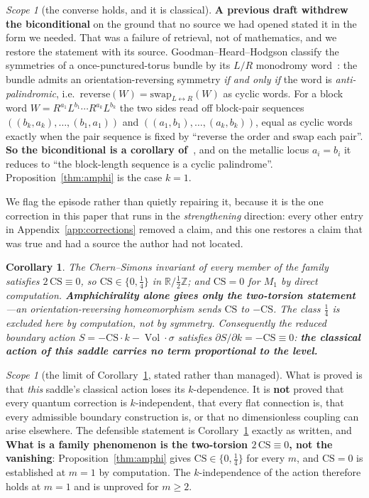 \documentclass[11pt,reqno]{amsart}
\theoremstyle{plain}
\newtheorem{corollary}[theorem]{Corollary}
\theoremstyle{definition}
\theoremstyle{remark}
\newtheorem{scope}[theorem]{Scope}
\newcommand{\Z}{\mathbb{Z}}
\newcommand{\R}{\mathbb{R}}
\newcommand{\Vol}{\operatorname{Vol}}
\begin{document}
\begin{scope}[the converse holds, and it is classical]\label{sc:amphiscope}
\textbf{A previous draft withdrew the biconditional} on the ground that no source we had
opened stated it in the form we needed. That was a failure of retrieval, not of
mathematics, and we restore the statement with its source. Goodman--Heard--Hodgson
classify the symmetries of a once-punctured-torus bundle by its $L/R$ monodromy
word~\cite{GHH}: the bundle admits an orientation-reversing symmetry \emph{if and only
if} the word is \emph{anti-palindromic}, i.e.\ $\mathrm{reverse}(W)=\mathrm{swap}_{L\leftrightarrow R}(W)$
as cyclic words. For a block word $W=R^{a_1}L^{b_1}\cdots R^{a_k}L^{b_k}$ the two sides
read off block-pair sequences $((b_k,a_k),\dots,(b_1,a_1))$ and $((a_1,b_1),\dots,(a_k,b_k))$,
equal as cyclic words exactly when the pair sequence is fixed by ``reverse the order and
swap each pair''. \textbf{So the biconditional is a corollary of~\cite{GHH}}, and on the
metallic locus $a_i=b_i$ it reduces to ``the block-length sequence is a cyclic
palindrome''. Proposition~\ref{thm:amphi} is the case $k=1$.

We flag the episode rather than quietly repairing it, because it is the one correction in
this paper that runs in the \emph{strengthening} direction: every other entry in
Appendix~\ref{app:corrections} removed a claim, and this one restores a claim that was
true and had a source the author had not located.
\end{scope}

\begin{corollary}\label{cor:cs}
The Chern--Simons invariant of every member of the family satisfies
$2\,\mathrm{CS}\equiv0$, so $\mathrm{CS}\in\{0,\tfrac14\}$ in $\R/\tfrac12\Z$; and
$\mathrm{CS}=0$ for $M_1$ by direct computation. \textbf{Amphichirality alone gives only
the two-torsion statement}---an orientation-reversing homeomorphism sends
$\mathrm{CS}$ to $-\mathrm{CS}$. The class $\tfrac14$ is excluded here by
computation, not by symmetry. Consequently the reduced boundary action
$S=-\mathrm{CS}\cdot k-\Vol\cdot\sigma$ satisfies
$\partial S/\partial k=-\mathrm{CS}\equiv0$: \textbf{the classical action of this saddle
carries no term proportional to the level.}
\end{corollary}

\begin{scope}[the limit of Corollary~\ref{cor:cs}, stated rather than managed]\label{sc:scale}
What is proved is that \emph{this} saddle's classical action loses its
$k$-dependence. It is \textbf{not} proved that every quantum correction is
$k$-independent, that every flat connection is, that every admissible boundary
construction is, or that no dimensionless coupling can arise elsewhere. The defensible
statement is Corollary~\ref{cor:cs} exactly as written, and \textbf{What is a family phenomenon is the two-torsion
$2\,\mathrm{CS}\equiv0$, not the vanishing}: Proposition~\ref{thm:amphi} gives
$\mathrm{CS}\in\{0,\tfrac14\}$ for every $m$, and $\mathrm{CS}=0$ is established at
$m=1$ by computation. The $k$-independence of the action therefore holds at $m=1$ and is
unproved for $m\ge2$.
\end{scope}
\end{document}
